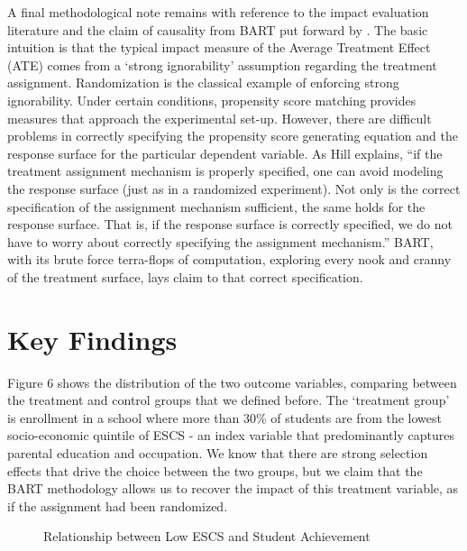 \documentclass[alpha-refs,fleqn]{wiley-article_p2}
\begin{document}
A final methodological note remains with reference to the impact evaluation literature and the claim of causality from BART put forward by \cite{Hill_2011}. The basic intuition is that the typical impact measure of the Average Treatment Effect (ATE) comes from a `strong ignorability' assumption regarding the treatment assignment. Randomization is the classical example of enforcing strong ignorability. Under certain conditions, propensity score matching provides measures that approach the experimental set-up. However, there are difficult problems in correctly specifying the propensity score generating equation and the response surface for the particular dependent variable. As Hill explains, ``if the treatment assignment mechanism is properly specified, one can avoid modeling the response surface (just as in a randomized experiment). Not only is the correct specification of the assignment mechanism sufficient, the same holds for the response surface. That is, if the response surface is correctly specified, we do not have to worry about correctly specifying the assignment mechanism.'' BART, with its brute force terra-flops of computation, exploring every nook and cranny of the treatment surface, lays claim to that correct specification. 

\section{Key Findings} 

Figure 6 shows the distribution of the two outcome variables, comparing between the treatment and control groups that we defined before. The `treatment group' is enrollment in a school where more than 30\% of students are from the lowest socio-economic quintile of ESCS - an index variable that predominantly captures parental education and occupation. We know that there are strong selection effects that drive the choice between the two groups, but we claim that the BART methodology allows us to recover the impact of this treatment variable, as if the assignment had been randomized. 

\begin{group} 
\centering
\begin{figure}[htb]
\begin{subfigure}[Panel A. First BART Model]{
\texttt{[image: Fig31a.png]}}
\end{subfigure}
\begin{subfigure}[Panel B. Second BART Model]{
\texttt{[image: Fig31b.png]}}
\end{subfigure}
\caption{Relationship between Low ESCS and Student Achievement}\label{fig:1}
\end{figure}
\end{group} 
\end{document}
